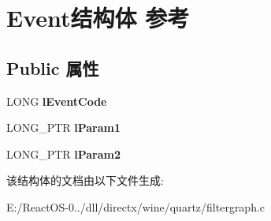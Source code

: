 \hypertarget{struct_event}{}\section{Event结构体 参考}
\label{struct_event}
\subsection*{Public 属性}
\begin{DoxyCompactItemize}
\item 
\mbox{\label{struct_event_af93cecedd785e7185f74a34d72b180bc}} 
L\+O\+NG {\bfseries l\+Event\+Code}
\item 
\mbox{\label{struct_event_ae5bfd2031e0252c03250ede2b30e491f}} 
L\+O\+N\+G\+\_\+\+P\+TR {\bfseries l\+Param1}
\item 
\mbox{\label{struct_event_a542d395c97d2cf326fbb21af5865df61}} 
L\+O\+N\+G\+\_\+\+P\+TR {\bfseries l\+Param2}
\end{DoxyCompactItemize}


该结构体的文档由以下文件生成\+:\begin{DoxyCompactItemize}
\item 
E\+:/\+React\+O\+S-\/0../dll/directx/wine/quartz/filtergraph.\+c\end{DoxyCompactItemize}
